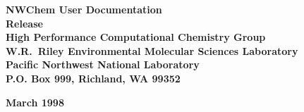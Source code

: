 
\begin{titlepage}

\begin{centering}


{\bf\Huge NWChem User Documentation}\\[0.5in] 
{\bf\Huge Release \nwchemversion}\\[1.0in]

{\bf\Large High Performance Computational Chemistry Group\\
    W.R.\ Riley Environmental Molecular Sciences Laboratory\\
    Pacific Northwest National Laboratory\\
    P.O. Box 999, Richland, WA 99352\\[0.5in]}

{\bf\Large March 1998}\\[1.0in]




\end{centering}

\end{titlepage}
